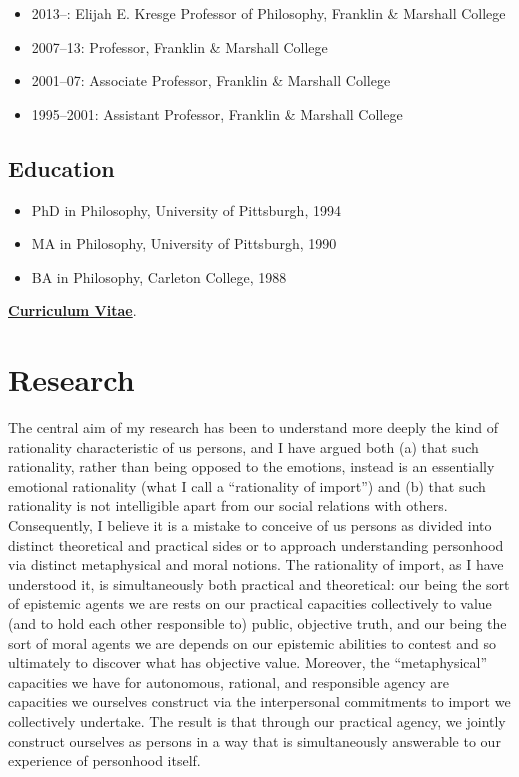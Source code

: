 \documentclass[%
  11pt,%
]{article}
\begin{document}
\begin{itemize}
  \item 2013--: Elijah E. Kresge Professor of Philosophy, Franklin \& Marshall College
  \item 2007--13: Professor, Franklin \& Marshall College
  \item 2001--07: Associate Professor, Franklin \& Marshall College
  \item 1995--2001: Assistant Professor, Franklin \& Marshall College
\end{itemize}

\subsection*{Education}

\begin{itemize}
  \item PhD in Philosophy, University of Pittsburgh, 1994
  \item MA in Philosophy, University of Pittsburgh, 1990
  \item BA in Philosophy, Carleton College, 1988
\end{itemize}

\noindent\href{https://drive.google.com/file/d/1-8fjo2F9EzgfDyYo_WSTYhaU-xrDNU8P/view}{\textbf{Curriculum Vitae}}.

\ifdefined\HCode
\fi

\section{Research}

The central aim of my research has been to understand more deeply the kind of rationality characteristic of us persons, and I have argued both (a) that such rationality, rather than being opposed to the emotions, instead is an essentially emotional rationality (what I call a \enquote{rationality of import}) and (b) that such rationality is not intelligible apart from our social relations with others. Consequently, I believe it is a mistake to conceive of us persons as divided into distinct theoretical and practical sides or to approach understanding personhood via distinct metaphysical and moral notions. The rationality of import, as I have understood it, is simultaneously both practical and theoretical: our being the sort of epistemic agents we are rests on our practical capacities collectively to value (and to hold each other responsible to) public, objective truth, and our being the sort of moral agents we are depends on our epistemic abilities to contest and so ultimately to discover what has objective value. Moreover, the \enquote{metaphysical} capacities we have for autonomous, rational, and responsible agency are capacities we ourselves construct via the interpersonal commitments to import we collectively undertake. The result is that through our practical agency, we jointly construct ourselves as persons in a way that is simultaneously answerable to our experience of personhood itself.
\end{document}
